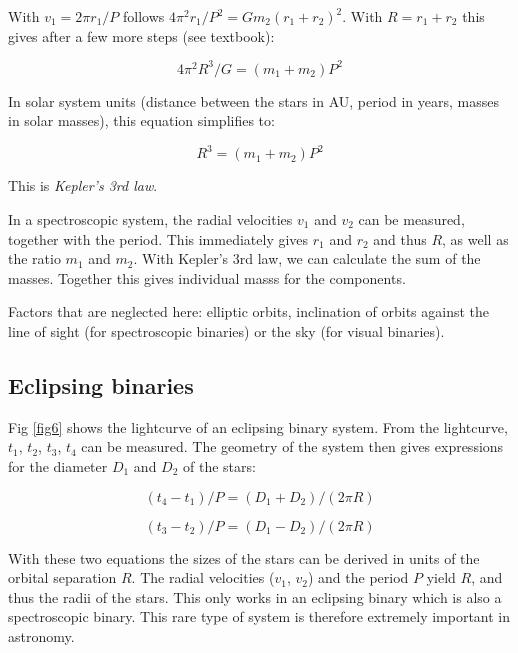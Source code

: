 With $v_1 = 2 \pi r_1 / P$ follows $4 \pi^2 r_1 / P^2 = G m_2 (r_1 + r_2)^2$. With $R = r_1 + r_2$ this gives after a few more steps (see textbook):

\begin{equation}
4 \pi^2 R^3 / G = (m_1 + m_2) P^2
\label{eq11}
\end{equation}

In solar system units (distance between the stars in AU, period in years, masses in solar masses), this equation simplifies to:

\begin{equation}
R^3 = (m_1 + m_2) P^2
\label{eq12}
\end{equation}

This is \textit{Kepler's 3rd law}. 

In a spectroscopic system, the radial velocities $v_1$ and $v_2$ can be measured, together with the period. This immediately gives $r_1$ and $r_2$ and thus $R$, as well as the ratio $m_1$ and $m_2$. With Kepler's 3rd law, we can calculate the sum of the masses. Together this gives individual masss for the components. 

Factors that are neglected here: elliptic orbits, inclination of orbits against the line of sight (for spectroscopic binaries) or the sky (for visual binaries). 

\subsection{Eclipsing binaries}

Fig \ref{fig6} shows the lightcurve of an eclipsing binary system. From the lightcurve, $t_1$, $t_2$, $t_3$, $t_4$ can be measured. The geometry of the system then gives expressions for the diameter $D_1$ and $D_2$ of the stars:

\begin{equation}
(t_4 - t_1) / P = (D_1 + D_2) / (2 \pi R)
\label{eq13}
\end{equation}

\begin{equation}
(t_3 - t_2) / P = (D_1 - D_2) / (2 \pi R)
\label{eq14}
\end{equation}

With these two equations the sizes of the stars can be derived in units of the orbital separation $R$. The radial velocities ($v_1$, $v_2$) and the period $P$ yield $R$, and thus the radii of the stars. This only works in an eclipsing binary which is also a spectroscopic binary. This rare type of system is therefore extremely important in astronomy.

